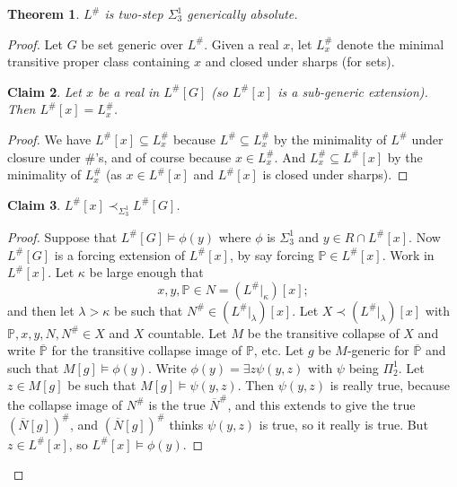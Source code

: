 \documentclass{article}
\theoremstyle{plain}
\newtheorem{theorem}{Theorem}[section]
\newtheorem{claim}[theorem]{Claim}
\theoremstyle{definition}
\newcommand{\Lsharp}{L^{\#}}
\begin{document}
\begin{theorem}
$L^{\#}$ is two-step $\Sigma^1_3$ generically absolute.
\end{theorem}



\begin{proof}
Let $G$ be set generic over $L^{\#}$.
Given a real $x$, let $\Lsharp_x$ denote the minimal transitive proper class containing $x$ and closed under sharps (for sets).

\begin{claim}
Let $x$ be a real in $L^{\#}[G]$ (so $L^{\#}[x]$ is a sub-generic extension). Then $L^{\#}[x] = L^{\#}_x$.
\end{claim}

\begin{proof}
We have $L^{\#}[x] \subseteq L^{\#}_x$ because $L^{\#} \subseteq L^{\#}_x$ by the minimality of $\Lsharp$ under closure under \#'s, and of course because $x \in \Lsharp_x$.
And $\Lsharp_x \subseteq \Lsharp[x]$ by the minimality of $\Lsharp_x$ (as $x \in \Lsharp[x]$ and $\Lsharp[x]$ is closed under sharps).
\end{proof}

\begin{claim}
$\Lsharp[x] \prec_{\Sigma^1_3} \Lsharp[G]$.
\end{claim}

\begin{proof}
Suppose that $\Lsharp [G] \models \phi(y)$ where $\phi$ is $\Sigma^1_3$ and $y \in R \cap \Lsharp [x]$. Now $\Lsharp [G]$ is a forcing extension of $\Lsharp [x]$, by say forcing $\mathbb{P} \in \Lsharp [x]$.
Work in $\Lsharp [x]$. Let $\kappa$ be large enough that
$$x, y, \mathbb{P} \in N = (\Lsharp |_{\kappa})[x];$$
and then let $\lambda > \kappa$ be such that $N^\# \in (\Lsharp |_{\lambda})[x]$. Let $X \prec (\Lsharp|_{\lambda})[x]$ with $\mathbb{P}, x, y, N, N^\# \in X$ and $X$ countable. Let $M$ be the transitive collapse of $X$ and write $\overline{\mathbb{P}}$ for the transitive collapse image of $\mathbb{P}$, etc. Let $g$ be $M$-generic for $\overline{\mathbb{P}}$ and such that $M[g] \models \phi(y)$. Write $\phi(y) = \exists z \psi(y, z)$ with $\psi$ being $\Pi^1_2$. Let $z \in M[g]$ be such that $M[g] \models \psi(y, z)$. Then $\psi(y, z)$ is really true, because the collapse image of $N^\#$ is the true $\overline{N}^\#$, and this extends to give the true $(\overline{N}[g])^\#$, and $(\overline{N}[g])^\#$ thinks $\psi(y, z)$ is true, so it really is true. But $z \in \Lsharp[x]$, so $\Lsharp[x] \models \phi(y)$.
\end{proof}

\end{proof}
\end{document}
